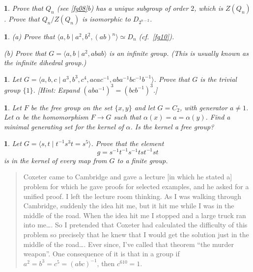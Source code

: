 \documentclass[a4paper,11pt,final]{memoir}%
\newtheorem{exercise}[Y]{}
\theoremstyle{nonumberplain}
\begin{document}
\begin{exercise}
\label{x8} Prove that $Q_{n}$ (see \ref{fg08}b) has a unique subgroup of order
$2$, which is $Z(Q_{n})$. Prove that $Q_{n}/Z(Q_{n})$ is isomorphic to
$D_{2^{n-2}}$.
\end{exercise}

\begin{exercise}
\label{x9} (a) Prove that $\langle a,b\mid a^{2},b^{2},(ab)^{n}\rangle\simeq
D_{n}$ (cf.\ \ref{fg10}).

\noindent(b) Prove that $G=\langle a,b\mid a^{2},abab\rangle$ is an infinite
group. (This is usually known as the infinite dihedral group.)
\end{exercise}

\begin{exercise}
\label{x10} Let $G=\langle a,b,c\mid a^{3},b^{3},c^{4},acac^{-1}%
,aba^{-1}bc^{-1}b^{-1}\rangle$. Prove that $G$ is the trivial group $\{1\}$.
[Hint: Expand $(aba^{-1})^{3}=(bcb^{-1})^{3}$.]
\end{exercise}

\begin{exercise}
\label{x11} Let $F$ be the free group on the set $\{x,y\}$ and let $G=C_{2}$,
with generator $a\neq1$. Let $\alpha$ be the homomorphism $F\rightarrow G$
such that $\alpha(x)=a=\alpha(y)$. Find a minimal generating set for the
kernel of $\alpha$. Is the kernel a free group?
\end{exercise}

\begin{exercise}
\label{x12} Let $G=\langle s,t\mid t^{-1}s^{3}t=s^{5}\rangle$. Prove that the
element
\[
g=s^{-1}t^{-1}s^{-1}tst^{-1}st
\]
is in the kernel of every map from $G$ to a finite group.
\end{exercise}

\medskip

\begin{quote}
{\footnotesize Coxeter came to Cambridge and gave a lecture [in which he
stated a] problem for which he gave proofs for selected examples, and he asked
for a unified proof. I left the lecture room thinking. As I was walking
through Cambridge, suddenly the idea hit me, but it hit me while I was in the
middle of the road. When the idea hit me I stopped and a large truck ran into
me\ldots. So I pretended that Coxeter had calculated the difficulty of this
problem so precisely that he knew that I would get the solution just in the
middle of the road\ldots. Ever since, I've called that theorem
\textquotedblleft the murder weapon\textquotedblright. One consequence of it
is that in a group if $a^{2}=b^{3}=c^{5}=(abc)^{-1}$, then $c^{610}=1$. }
\end{quote}
\end{document}
